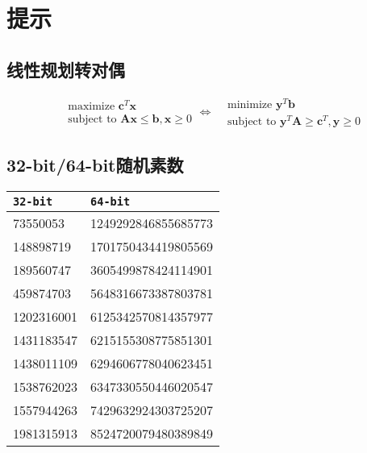 \chapter{提示}

\section{线性规划转对偶}

\begin{equation*}
\begin{aligned}
&\text{maximize }\mathbf{c}^{T}\mathbf{x}\\
&\text{subject to }\mathbf{A}\mathbf{x} \leq \mathbf{b}, \mathbf{x} \geq 0
\end{aligned}
\Longleftrightarrow
\begin{aligned}
&\text{minimize }\mathbf{y}^{T}\mathbf{b}\\
&\text{subject to }\mathbf{y}^{T}\mathbf{A} \geq \mathbf{c}^{T}, \mathbf{y} \geq 0
\end{aligned}
\end{equation*}

\section{32-bit/64-bit随机素数}
\begin{tabular}{|l|l|}
\hline	
\texttt{32-bit} & \texttt{64-bit} \\
\hline	
73550053 & 1249292846855685773 \\
\hline	
148898719 & 1701750434419805569 \\ 
\hline	
189560747 & 3605499878424114901 \\
\hline	
459874703 & 5648316673387803781 \\ 
\hline	
1202316001 & 6125342570814357977 \\ 
\hline	
1431183547 & 6215155308775851301 \\
\hline	
1438011109 & 6294606778040623451 \\
\hline	
1538762023 & 6347330550446020547 \\
\hline	
1557944263 & 7429632924303725207 \\
\hline	
1981315913 & 8524720079480389849 \\
\hline	
\end{tabular}
